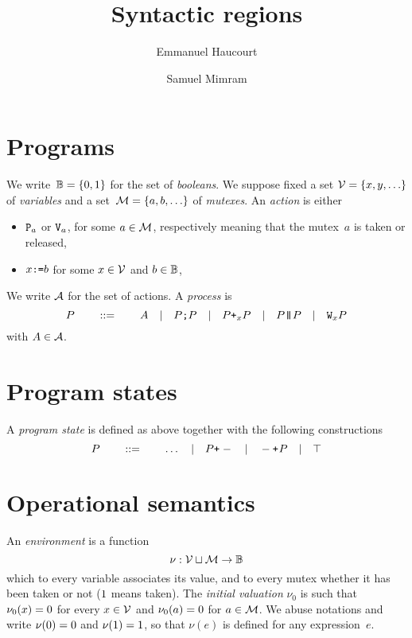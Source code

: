 \documentclass[a4paper]{article}
\title{Syntactic regions}
\author{Emmanuel Haucourt \and Samuel Mimram}
\theoremstyle{theorem}
\theoremstyle{example}
\theoremstyle{remark}
\begin{document}
\maketitle

\section{Programs}
We write~$\B=\set{\Bfalse,\Btrue}$ for the set of \emph{booleans}. We suppose
fixed a set $\variables=\set{x,y,\ldots}$ of \emph{variables} and a
set~$\mutexes=\set{a,b,\ldots}$ of \emph{mutexes}.
An \emph{action} is either
\begin{itemize}
\item $\P a$ or $\V a$, for some $a\in\mutexes$, respectively meaning that the
  mutex~$a$ is taken or released,
\item $\pset x b$ for some $x\in\variables$ and $b\in\B$,
\end{itemize}
We write $\actions$ for the set of actions. A \emph{process} is
\[
  P
  \qquad::=\qquad
  A
  \quad|\quad
  \pseq PP
  \quad|\quad
  \por xPP
  \quad|\quad
  \ppar PP
  \quad|\quad
  \ploop xP
\]
with $A\in\actions$.

\section{Program states}
A \emph{program state} is defined as above together with the following
constructions
\[
  P
  \qquad::=\qquad
  \ldots
  \quad|\quad
  \porl P
  \quad|\quad
  \porr P
  \quad|\quad
  \pskip
\]

\section{Operational semantics}
An
\emph{environment} is a function
\[
  \nu:\variables\sqcup\mutexes\to\B
\]
which to every variable associates its value, and to every mutex whether it has
been taken or not ($\Btrue$ means taken). The \emph{initial valuation} $\nu_0$
is such that $\nu_0(x)=\Bfalse$ for every $x\in\variables$ and
$\nu_0(a)=\Bfalse$ for $a\in\mutexes$. We abuse notations and write
$\nu(\Bfalse)=\Bfalse$ and $\nu(\Btrue)=\Btrue$, so that $\nu(e)$ is defined for
any expression~$e$.
\end{document}
